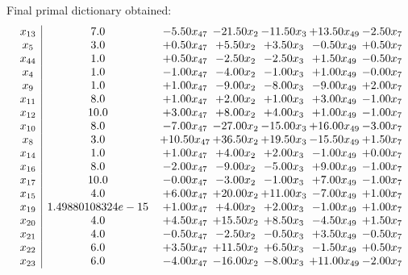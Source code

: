 \documentclass[8pt]{article}
\begin{document}
 Final primal dictionary obtained: 
\[\begin{array}{c| c c@{\hskip 2pt} c@{\hskip 2pt} c@{\hskip 2pt} c@{\hskip 2pt} c@{\hskip 2pt} }
 x_{13}   &  7.0 & -5.50 x_{47} & -21.50 x_{2} & -11.50 x_{3} & + 13.50 x_{49} & -2.50 x_{7}\\
 x_{5}   &  3.0 & +  0.50 x_{47} & +  5.50 x_{2} & +  3.50 x_{3} & -0.50 x_{49} & +  0.50 x_{7}\\
 x_{44}   &  1.0 & +  0.50 x_{47} & -2.50 x_{2} & -2.50 x_{3} & +  1.50 x_{49} & -0.50 x_{7}\\
 x_{4}   &  1.0 & -1.00 x_{47} & -4.00 x_{2} & -1.00 x_{3} & +  1.00 x_{49} & -0.00 x_{7}\\
 x_{9}   &  1.0 & +  1.00 x_{47} & -9.00 x_{2} & -8.00 x_{3} & -9.00 x_{49} & +  2.00 x_{7}\\
 x_{11}   &  8.0 & +  1.00 x_{47} & +  2.00 x_{2} & +  1.00 x_{3} & +  3.00 x_{49} & -1.00 x_{7}\\
 x_{12}   &  10.0 & +  3.00 x_{47} & +  8.00 x_{2} & +  4.00 x_{3} & +  1.00 x_{49} & -1.00 x_{7}\\
 x_{10}   &  8.0 & -7.00 x_{47} & -27.00 x_{2} & -15.00 x_{3} & + 16.00 x_{49} & -3.00 x_{7}\\
 x_{8}   &  3.0 & + 10.50 x_{47} & + 36.50 x_{2} & + 19.50 x_{3} & -15.50 x_{49} & +  1.50 x_{7}\\
 x_{14}   &  1.0 & +  1.00 x_{47} & +  4.00 x_{2} & +  2.00 x_{3} & -1.00 x_{49} & +  0.00 x_{7}\\
 x_{16}   &  8.0 & -2.00 x_{47} & -9.00 x_{2} & -5.00 x_{3} & +  9.00 x_{49} & -1.00 x_{7}\\
 x_{17}   &  10.0 & -0.00 x_{47} & -3.00 x_{2} & -1.00 x_{3} & +  7.00 x_{49} & -1.00 x_{7}\\
 x_{15}   &  4.0 & +  6.00 x_{47} & + 20.00 x_{2} & + 11.00 x_{3} & -7.00 x_{49} & +  1.00 x_{7}\\
 x_{19}   &  1.49880108324e-15 & +  1.00 x_{47} & +  4.00 x_{2} & +  2.00 x_{3} & -1.00 x_{49} & +  1.00 x_{7}\\
 x_{20}   &  4.0 & +  4.50 x_{47} & + 15.50 x_{2} & +  8.50 x_{3} & -4.50 x_{49} & +  1.50 x_{7}\\
 x_{21}   &  4.0 & -0.50 x_{47} & -2.50 x_{2} & -0.50 x_{3} & +  3.50 x_{49} & -0.50 x_{7}\\
 x_{22}   &  6.0 & +  3.50 x_{47} & + 11.50 x_{2} & +  6.50 x_{3} & -1.50 x_{49} & +  0.50 x_{7}\\
 x_{23}   &  6.0 & -4.00 x_{47} & -16.00 x_{2} & -8.00 x_{3} & + 11.00 x_{49} & -2.00 x_{7}\\

\end{array}\]
\end{document}
